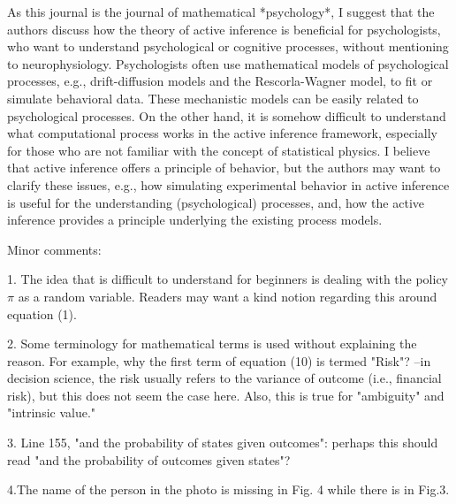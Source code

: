 \documentclass{article}
\begin{document}
As this journal is the journal of mathematical *psychology*, I suggest that the authors discuss how the theory of active inference is beneficial for psychologists, who want to understand psychological or cognitive processes, without mentioning to neurophysiology. Psychologists often use mathematical models of psychological processes, e.g., drift-diffusion models and the Rescorla-Wagner model, to fit or simulate behavioral data. These mechanistic models can be easily related to psychological processes. On the other hand, it is somehow difficult to understand what computational process works in the active inference framework, especially for those who are not familiar with the concept of statistical physics. I believe that active inference offers a principle of behavior, but the authors may want to clarify these issues, e.g., how simulating experimental behavior in active inference is useful for the understanding (psychological) processes, and, how the active inference provides
a principle underlying the existing process models.

Minor comments:

1. The idea that is difficult to understand for beginners is dealing with the policy $\pi$ as a random variable. Readers may want a kind notion regarding this around equation (1).
 
2. Some terminology for mathematical terms is used without explaining the reason. For example, why the first term of equation (10) is termed "Risk"? --in decision science, the risk usually refers to the variance of outcome (i.e., financial risk), but this does not seem the case here. Also, this is true for "ambiguity" and "intrinsic value."
 
3. Line 155, "and the probability of states given outcomes": perhaps this should read "and the probability of outcomes given states"?

4.The name of the person in the photo is missing in Fig. 4 while there is in Fig.3.

 

\end{document}
